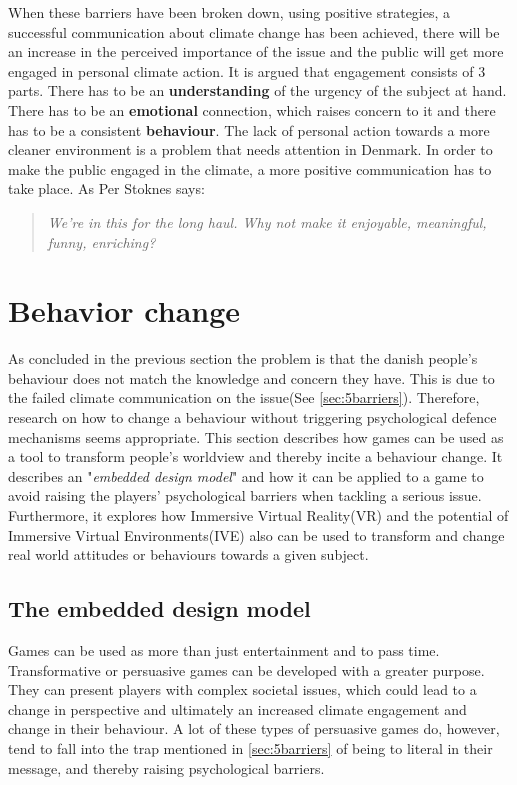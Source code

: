         When these barriers have been broken down, using positive strategies, a successful communication about climate change has been achieved, there will be an increase in the perceived importance of the issue and the public will get more engaged in personal climate action\cite{the5Ds}. It is argued that engagement consists of 3 parts. There has to be an \textbf{understanding} of the urgency of the subject at hand. There has to be an \textbf{emotional} connection, which raises concern to it and there has to be a consistent \textbf{behaviour}\cite{climateChangeEngagement3Elements, vrEngagementClimateChange, reorientingClimageChangeCommunication}. The lack of personal action towards a more cleaner environment is a problem that needs attention in Denmark. In order to make the public engaged in the climate, a more positive communication has to take place. As Per Stoknes says: 
        \begin{quote}
            \textit{We’re in this for the long haul. Why not make it enjoyable, meaningful, funny, enriching?}\citep[p.~117]{storyAboutClimateChange}
        \end{quote}
        
        
\section{Behavior change}
    As concluded in the previous section the problem is that the danish people's behaviour does not match the knowledge and concern they have. This is due to the failed climate communication on the issue(See \autoref{sec:5barriers}). Therefore, research on how to change a behaviour without triggering psychological defence mechanisms seems appropriate.
    This section describes how games can be used as a tool to transform people's worldview and thereby incite a behaviour change. It describes an "\textit{embedded design model}" and how it can be applied to a game to avoid raising the players' psychological barriers when tackling a serious issue. 
    Furthermore, it explores how Immersive Virtual Reality(VR) and the potential of Immersive Virtual Environments(IVE) also can be used to transform and change real world attitudes or behaviours towards a given subject.
    
   \subsection{The embedded design model}
    Games can be used as more than just entertainment and to pass time. Transformative or persuasive games can be developed with a greater purpose\cite{transformationalFramework}. They can present players with complex societal issues, which could lead to a change in perspective and ultimately an increased climate engagement and change in their behaviour\cite{persuasiveGameplay}. A lot of these types of persuasive games do, however, tend to fall into the trap mentioned in \autoref{sec:5barriers} of being to literal in their message, and thereby raising psychological barriers\cite{embeddedDesignModel}.
    
